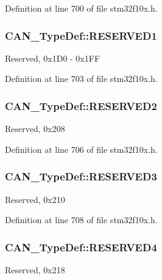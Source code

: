 Definition at line 700 of file stm32f10x.\-h.

\hypertarget{struct_c_a_n___type_def_abd4c34405c765b5bd5fe38bbeb7569b6}{
\subsubsection[{R\-E\-S\-E\-R\-V\-E\-D1}]{ C\-A\-N\-\_\-\-Type\-Def\-::\-R\-E\-S\-E\-R\-V\-E\-D1}}\label{struct_c_a_n___type_def_abd4c34405c765b5bd5fe38bbeb7569b6}
Reserved, 0x1\-D0 -\/ 0x1\-F\-F 

Definition at line 703 of file stm32f10x.\-h.

\hypertarget{struct_c_a_n___type_def_ab29069c9fd10eeec47414abd8d06822f}{
\subsubsection[{R\-E\-S\-E\-R\-V\-E\-D2}]{ C\-A\-N\-\_\-\-Type\-Def\-::\-R\-E\-S\-E\-R\-V\-E\-D2}}\label{struct_c_a_n___type_def_ab29069c9fd10eeec47414abd8d06822f}
Reserved, 0x208 

Definition at line 706 of file stm32f10x.\-h.

\hypertarget{struct_c_a_n___type_def_af730af32307f845895465e8ead57d20c}{
\subsubsection[{R\-E\-S\-E\-R\-V\-E\-D3}]{ C\-A\-N\-\_\-\-Type\-Def\-::\-R\-E\-S\-E\-R\-V\-E\-D3}}\label{struct_c_a_n___type_def_af730af32307f845895465e8ead57d20c}
Reserved, 0x210 

Definition at line 708 of file stm32f10x.\-h.

\hypertarget{struct_c_a_n___type_def_a51c408c7c352b8080f0c6d42bf811d43}{
\subsubsection[{R\-E\-S\-E\-R\-V\-E\-D4}]{ C\-A\-N\-\_\-\-Type\-Def\-::\-R\-E\-S\-E\-R\-V\-E\-D4}}\label{struct_c_a_n___type_def_a51c408c7c352b8080f0c6d42bf811d43}
Reserved, 0x218 

